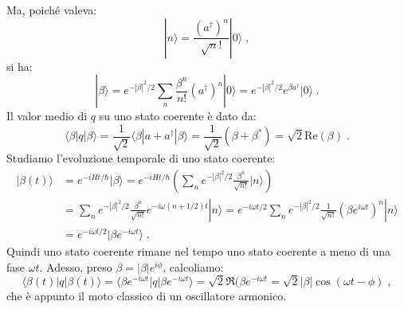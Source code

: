\documentclass[12pt,a4paper]{report}
\theoremstyle{definition}
\numberwithin{equation}{section}
\newcommand{\bra}{\langle}
\newcommand{\ket}{\rangle}
\newcommand{\adj}[1]{#1^{\dagger}}
\begin{document}
Ma, poiché valeva:
$$
|n\ket=\frac{(\adj{a})^n}{\sqrt{n}!}|0\ket\;,
$$
si ha:
\begin{equation}
|\beta\ket=e^{-|\beta|^2/2}\sum_n \frac{\beta^n}{n!}(\adj{a})^n|0\ket=e^{-|\beta|^2/2}e^{\beta\adj{a}}|0\ket\;. \label{ch4_staticoerenti}
\end{equation}
Il valor medio di $q$ su uno stato coerente è dato da:
\begin{equation}
\bra\beta|q|\beta\ket=\frac{1}{\sqrt{2}}\bra\beta|a+\adj{a}|\beta\ket=\frac{1}{\sqrt{2}}(\beta+\beta^*)=\sqrt{2}\mathrm{Re}(\beta)\;.
\end{equation}
Studiamo l'evoluzione temporale di uno stato coerente:
\begin{align*}
|\beta(t)\ket &= e^{-iHt/\hbar}|\beta\ket=e^{-iHt/\hbar}\left(\sum_n e^{-|\beta|^2/2}\frac{\beta^n}{\sqrt{n!}}|n\ket\right) \\
&= \sum_n e^{-|\beta|^2/2}\frac{\beta^n}{\sqrt{n!}}e^{-i\omega(n+1/2)t}|n\ket= e^{-i\omega t/2}\sum_n e^{-|\beta|^2/2}\frac{1}{\sqrt{n!}}(\beta e^{i\omega t})^n|n\ket \\
&= e^{-i\omega t/2}|\beta e^{-i\omega t}\ket\;.
\end{align*}
Quindi uno stato coerente rimane nel tempo uno stato coerente a meno di una fase $\omega t$. Adesso, preso $\beta=|\beta|e^{i\phi}$, calcoliamo:
$$
\bra \beta(t)|q|\beta(t)\ket=\bra\beta e^{-i\omega t}|q|\beta e^{-i\omega t}\ket=\sqrt{2}\Re(\beta e^{-i\omega t}=\sqrt{2}|\beta|\cos(\omega t-\phi)\;,
$$
che è appunto il moto classico di un oscillatore armonico.
\end{document}
